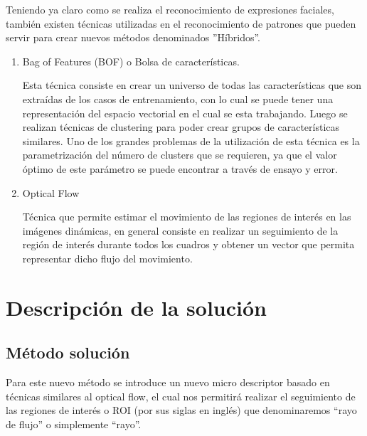 \documentclass{article}
\begin{document}
    Teniendo ya claro como se realiza el reconocimiento de expresiones faciales, también existen técnicas utilizadas en el reconocimiento de patrones que pueden servir para crear nuevos métodos denominados ''Híbridos''.
    \begin{enumerate}
    \item Bag of Features (BOF) o Bolsa de características.
    
Esta técnica consiste en crear un universo de todas las características que son extraídas de los casos de entrenamiento, con lo cual se puede tener una representación del espacio vectorial en el cual se esta trabajando. Luego se realizan técnicas de clustering para poder crear grupos de características similares. 
Uno de los grandes problemas de la utilización de esta técnica es la parametrización del número de clusters que se requieren, ya que el valor óptimo de este parámetro se puede encontrar a través de ensayo y error. 

    \item Optical Flow
    
Técnica que permite estimar el movimiento de las regiones de interés en las imágenes dinámicas, en general consiste en realizar un seguimiento de la región de interés durante todos los cuadros y obtener un vector que permita representar dicho flujo del movimiento.
    \end{enumerate}


\section{Descripción de la solución}
\subsection{Método solución}

Para este nuevo método se introduce un nuevo micro descriptor basado en técnicas similares al optical flow, el cual nos permitirá realizar el seguimiento de las regiones de interés o ROI (por sus siglas en inglés) que denominaremos ``rayo de flujo'' o simplemente ``rayo''.
\end{document}
